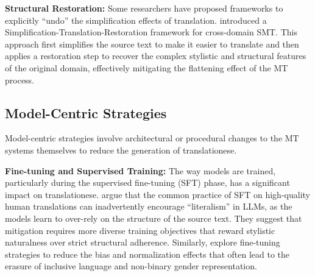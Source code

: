 \documentclass[11pt,a4paper]{article}
\begin{document}
\textbf{Structural Restoration:} Some researchers have proposed frameworks to explicitly ``undo'' the simplification effects of translation. \citet{chen2012simplification} introduced a Simplification-Translation-Restoration framework for cross-domain SMT. This approach first simplifies the source text to make it easier to translate and then applies a restoration step to recover the complex stylistic and structural features of the original domain, effectively mitigating the flattening effect of the MT process.

\subsection{Model-Centric Strategies}

Model-centric strategies involve architectural or procedural changes to the MT systems themselves to reduce the generation of translationese.

\textbf{Fine-tuning and Supervised Training:} The way models are trained, particularly during the supervised fine-tuning (SFT) phase, has a significant impact on translationese. \citet{li2025lost} argue that the common practice of SFT on high-quality human translations can inadvertently encourage ``literalism'' in LLMs, as the models learn to over-rely on the structure of the source text. They suggest that mitigation requires more diverse training objectives that reward stylistic naturalness over strict structural adherence. Similarly, \citet{jourdan2025translationese} explore fine-tuning strategies to reduce the bias and normalization effects that often lead to the erasure of inclusive language and non-binary gender representation.
\end{document}
